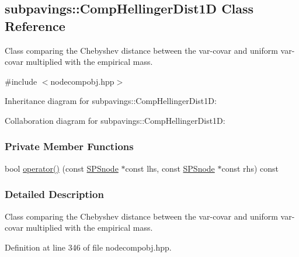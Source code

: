 \hypertarget{classsubpavings_1_1CompHellingerDist1D}{\subsection{subpavings\-:\-:\-Comp\-Hellinger\-Dist1\-D \-Class \-Reference}
\label{classsubpavings_1_1CompHellingerDist1D}
}


\-Class comparing the \-Chebyshev distance between the var-\/covar and uniform var-\/covar multiplied with the empirical mass.  




{\ttfamily \#include $<$nodecompobj.\-hpp$>$}



\-Inheritance diagram for subpavings\-:\-:\-Comp\-Hellinger\-Dist1\-D\-:


\-Collaboration diagram for subpavings\-:\-:\-Comp\-Hellinger\-Dist1\-D\-:
\subsubsection*{\-Private \-Member \-Functions}
\begin{DoxyCompactItemize}
\item 
bool \hyperlink{classsubpavings_1_1CompHellingerDist1D_a557adaeb83fb64c6f1a290fa31147ec8}{operator()} (const \hyperlink{classsubpavings_1_1SPSnode}{\-S\-P\-Snode} $\ast$const lhs, const \hyperlink{classsubpavings_1_1SPSnode}{\-S\-P\-Snode} $\ast$const rhs) const 
\end{DoxyCompactItemize}


\subsubsection{\-Detailed \-Description}
\-Class comparing the \-Chebyshev distance between the var-\/covar and uniform var-\/covar multiplied with the empirical mass. 

\-Definition at line 346 of file nodecompobj.\-hpp.



